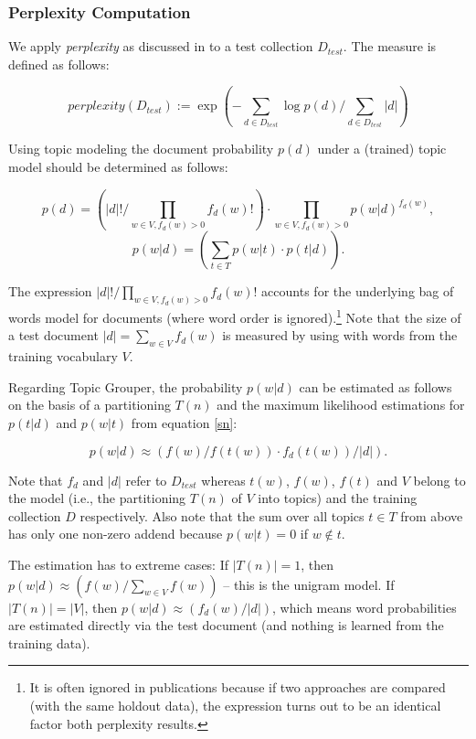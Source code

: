 \documentclass[10pt, a4paper, oneside]{article}
\begin{document}
\subsubsection{Perplexity Computation}

We apply \textit{perplexity} as discussed in \cite{Blei:2003:LDA:944919.944937} to a test collection $D_{test}$. The measure is defined as follows:

\[ perplexity(D_{test}) := \exp (- \sum_{d \in D_{test}} \log p(d) / \sum_{d \in D_{test}} |d| )\]

Using topic modeling the document probability $p(d)$ under a (trained) topic model should be determined as follows:

\[p(d) = (|d|! / \prod_{w \in V, f_d(w) > 0} f_d(w)!) \cdot \prod_{w \in V, f_d(w) > 0} p(w|d)^{f_d(w)},\] 
\[p(w|d) = (\sum_{t \in T} p(w|t) \cdot p(t|d)).\]

The expression $|d|! / \prod_{w \in V, f_d(w) > 0} f_d(w)!$ accounts for the underlying bag of words model for documents (where word order is ignored).\footnote{It is often ignored in publications because if two approaches are compared (with the same holdout data), the expression turns out to be an identical factor both perplexity results.}
Note that the size of a test document $|d| = \sum_{w \in V} f_d(w)$ is measured by using with words from the training vocabulary $V$.

Regarding Topic Grouper, the probability $p(w|d)$ can be estimated as follows on the basis of a partitioning $T(n)$ and the maximum likelihood estimations for $p(t|d)$ and $p(w|t)$ from equation \ref{sn}:

\[ p(w|d) \approx (f(w) / f(t(w)) \cdot f_d(t(w)) / |d|).\]

Note that $f_d$ and $|d|$ refer to $D_{test}$ whereas $t(w)$, $f(w)$, $f(t)$ and $V$ belong to the model (i.e., the partitioning $T(n)$ of $V$ into topics) and the training collection $D$ respectively.  Also note that the sum over all topics ${t \in T}$ from above has only one non-zero addend because $p(w|t) = 0$ if $w \notin t$.

The estimation has to extreme cases: If $|T(n)| = 1$, then $p(w|d) \approx (f(w) / \sum_{w \in V} f(w))$ -- this is the unigram model. If $|T(n)| = |V|$, then  $p(w|d) \approx (f_d(w) / |d|)$, which means word probabilities are estimated directly via the test document (and nothing is learned from the training data).
\end{document}
